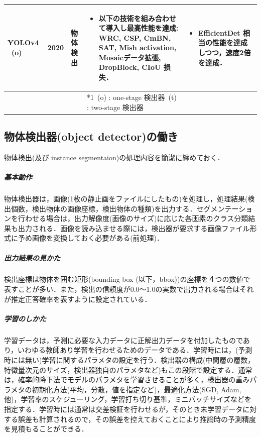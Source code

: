 \documentclass[twocolumn]{jsarticle} %
\begin{document}
\begin{table}
\begin{center}
\begin{tabularx}{\linewidth}{XcXp{7cm}X}
            YOLOv4 \cite{BWL20} \ (o) & 2020 & 物体検出 & 
            \begin{itemize}
                \vspace{-0.7\baselineskip}
                \setlength{\leftskip}{-3mm}
                \item 以下の技術を組み合わせて導入し最高性能を達成: WRC, CSP, CmBN, SAT, Mish activation, Mosaicデータ拡張, DropBlock, CIoU 損失．
            \end{itemize}
            &
            \begin{itemize}
                \vspace{-0.7\baselineskip}
                \setlength{\leftskip}{-3mm}
                \item EfficientDet 相当の性能を達成しつつ，速度2倍を達成．
            \end{itemize}
            \\
            \bottomrule
             &  &  & *1\ (o) : one-stage 検出器\quad *2\ (t) : two-stage 検出器 &  \\
        \end{tabularx}
    \end{center}
\end{table}%

\subsection{物体検出器(object detector)の働き}
物体検出(及び instance segmentaion)の処理内容を簡潔に纏めておく．
\subparagraph{基本動作}物体検出器は，画像(1枚の静止画をファイルにしたもの)を処理し，処理結果(検出個数，検出物体の画像座標，検出物体の種類)を出力する．セグメンテーションを行わせる場合は，出力解像度(画像のサイズ)に応じた各画素のクラス分類結果も出力される．画像を読み込ませる際には，検出器が要求する画像ファイル形式に予め画像を変換しておく必要がある(前処理)．

\subparagraph{出力結果の見かた}検出座標は物体を囲む矩形(bounding box (以下，bbox))の座標を４つの数値で表すことが多い．また，検出の信頼度が0.0〜1.0の実数で出力される場合はそれが推定正答確率を表すように設定されている．

\subparagraph{学習のしかた}学習データは，予測に必要な入力データに正解出力データを付加したものであり，いわゆる教師あり学習を行わせるためのデータである．学習時には，(予測時には無い)学習に関するパラメタの設定を行う．検出器の構成(中間層の層数，特徴量次元のサイズ，検出器独自のパラメタなど)もこの段階で設定する．通常は，確率的降下法でモデルのパラメタを学習させることが多く，検出器の重みパラメタの初期化方法(平均，分散，値を指定など)，最適化方法(SGD, Adam, 他)，学習率のスケジューリング，学習打ち切り基準，ミニバッチサイズなどを指定する．学習時には通常は交差検証を行わせるが，そのとき未学習データに対する誤差も計算されるので，その誤差を控えておくことにより推論時の予測精度を見積もることができる．
\end{document}
